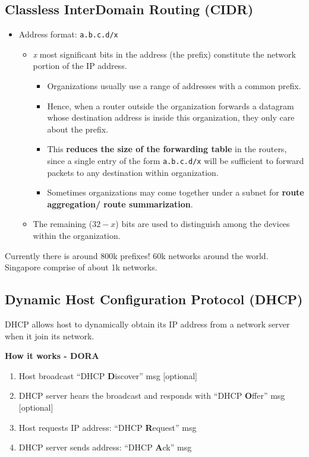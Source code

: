\documentclass[a4paper]{article}
\begin{document}
\subsection{Classless InterDomain Routing (CIDR)}
\begin{itemize}
    \item Address format: \texttt{a.b.c.d/x}
    \begin{itemize}[label=$\circ$]
        \item \textit{x} most significant bits in the address (the prefix) constitute the network portion of the IP address.
        \begin{itemize}[label=\tiny$\blacksquare$]
            \item Organizations usually use a range of addresses with a common prefix.
            \item Hence, when a router outside the organization forwards a datagram whose destination address is inside this organization, they only care about the prefix.
            \item This \textbf{reduces the size of the forwarding table} in the routers, since a single entry of the form \texttt{a.b.c.d/x} will be sufficient to forward packets to any destination within organization.
            \item Sometimes organizations may come together under a subnet for \textbf{route aggregation/ route summarization}.
        \end{itemize}
        \item The remaining ($32-x$) bits are used to distinguish among the devices within the organization.
    \end{itemize}
\end{itemize}
\begin{framed}
    \begin{displayquote}
        Currently there is around 800k prefixes! 60k networks around the world. Singapore comprise of about 1k networks.
    \end{displayquote}
\end{framed}

\subsection{Dynamic Host Configuration Protocol (DHCP)}
DHCP allows host to dynamically obtain its IP address from a network server when it join its network.

\bigskip

\noindent\textbf{How it works - DORA}
\begin{enumerate}
    \item Host broadcast ``DHCP \textbf{D}iscover'' msg [optional]
    \item DHCP server hears the broadcast and responds with ``DHCP \textbf{O}ffer'' msg [optional]
    \item Host requests IP address: ``DHCP \textbf{R}equest'' msg
    \item DHCP server sends address: ``DHCP \textbf{A}ck'' msg
\end{enumerate}
\end{document}
